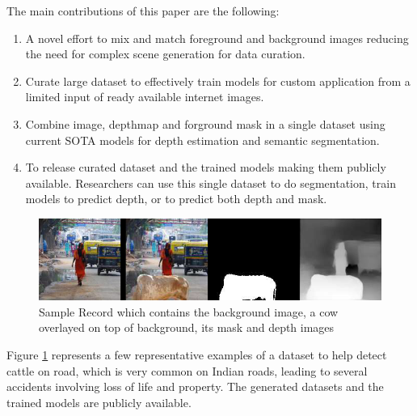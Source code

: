\documentclass[review]{cvpr}
\begin{document}
The main contributions of this paper are the following:
\begin{enumerate}
\item A novel effort to mix and match foreground and background images reducing the need for complex scene generation for data curation.
\item Curate large dataset to effectively train models for custom application from a limited input of ready available internet images.
\item Combine image, depthmap and forground mask in a single dataset using current SOTA models for depth estimation and semantic segmentation.
\item To release curated dataset and the trained models making them publicly available. Researchers can use this single dataset to do segmentation, 
train models to predict depth, or to predict both depth and mask.
\end{enumerate}
  

\begin{figure}
  \begin{center}
    \includegraphics[width=1\textwidth]{samplerecord.png}
  \end{center}
  \caption{Sample Record which contains the background image, a cow overlayed on top of background, its mask and depth images}
  \label{fig:sampledatarecord}
\end{figure}

Figure \ref{fig:sampledatarecord} represents a few representative examples of a dataset to help detect cattle on road,
 which is very common on Indian roads, leading to several accidents involving loss of life and property. 
 The generated datasets and the trained models are publicly available.





\end{document}
